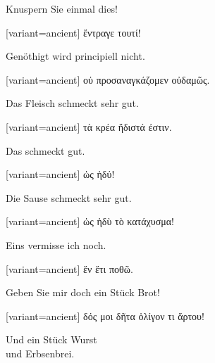 Knus\textcompwordmark{}pern Sie einmal dies!

\switchcolumn

\begin{greek}[variant=ancient]%
ἔντραγε τουτί!

\end{greek}%
\switchcolumn*

Genöthigt wird principiell nicht.

\switchcolumn

\begin{greek}[variant=ancient]%
οὐ προσαναγκάζομεν οὐδαμῶς.

\end{greek}%
\switchcolumn*

Das Fleisch schmeckt sehr gut.

\switchcolumn

\begin{greek}[variant=ancient]%
τὰ κρέα ἥδιστά ἐστιν.

\end{greek}%
\switchcolumn*

Das schmeckt gut.

\switchcolumn

\begin{greek}[variant=ancient]%
ὡς ἡδύ!

\end{greek}%
\switchcolumn*

Die Sause schmeckt sehr gut.

\switchcolumn

\begin{greek}[variant=ancient]%
ὡς ἡδὺ τὸ κατάχυσμα!

\end{greek}%
\switchcolumn*

Eins vermisse ich noch.

\switchcolumn

\begin{greek}[variant=ancient]%
ἕν ἔτι ποθῶ.

\end{greek}%
\switchcolumn*

Geben Sie mir doch ein Stück Brot!

\switchcolumn

\begin{greek}[variant=ancient]%
δός μοι δῆτα ὀλίγον τι ἄρτου!

\end{greek}%
\switchcolumn*

Und ein Stück Wurst\\
und Erbsenbrei.

